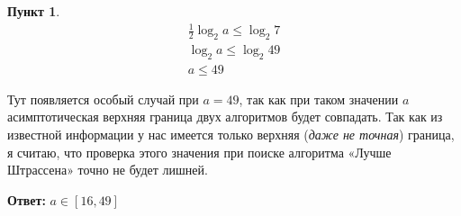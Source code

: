 \documentclass[11pt,a4paper]{scrarticle}
\theoremstyle{definition}
\newtheorem{subtask}{Пункт}
\begin{document}
\begin{subtask}
	\begin{gather*}
		\frac{1}{2} \log_2 a \leq \log_2 7 \\
		\log_2 a \leq \log_2 49 \\
		a \leq 49
	\end{gather*}

	Тут появляется особый случай при $a = 49$, так как при таком значении $a$ асимптотическая верхняя граница двух алгоритмов будет совпадать. Так как из известной информации у нас имеется только верхняя (\emph{даже не точная}) граница, я считаю, что проверка этого значения при поиске алгоритма «Лучше Штрассена» точно не будет лишней.

	\textbf{Ответ:} $a \in [16, 49]$
\end{subtask}
\end{document}

